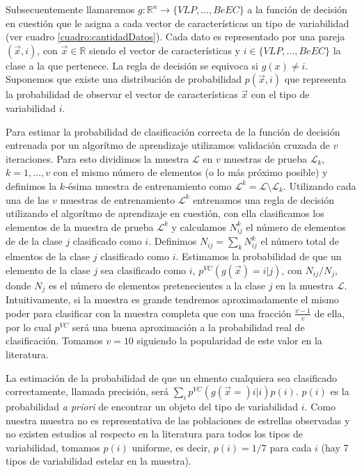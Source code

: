 \documentclass[letterpaper,12pt]{book}
\begin{document}
Subsecuentemente llamaremos $g:\mathbb{R}^{n}\rightarrow \{VLP,\dots, BeEC\}$ a la función de decisión en cuestión que le asigna a cada vector de características un tipo de variabilidad (ver cuadro \ref{cuadro:cantidadDatos}). Cada dato es representado por una pareja $(\vec{x}, i)$, con $\vec{x}\in\mathbb{R}$ siendo el vector de características y $i\in\{VLP,\dots, BeEC\}$ la clase a la que pertenece. La regla de decisión se equivoca si  $g(x)\neq i$. Suponemos que existe una distribución de probabilidad $p(\vec{x},i)$ que representa la probabilidad de observar el vector de características $\vec{x}$ con el tipo de variabilidad $i$.

Para estimar la probabilidad de clasificación correcta de la función de decisión entrenada por un algorítmo de aprendizaje utilizamos validación cruzada de $v$ iteraciones. Para esto dividimos la muestra $\mathcal{L}$ en $v$ muestras de prueba $\mathcal{L}_{k}$, $k=1,\dots,v$ con el mismo número de elementos (o lo más próximo posible) y definimos la $k$-ésima muestra de entrenamiento como $\mathcal{L}^{k} = \mathcal{L}\setminus \mathcal{L}_{k}$. Utilizando cada una de las $v$ muestras de entrenamiento $\mathcal{L}^{k}$  entrenamos una regla de decisión utilizando el algorítmo de aprendizaje en cuestión, con ella clasificamos los elementos de la muestra de prueba $\mathcal{L}^{k}$ y calculamos $N_{ij}^{k}$ el número de elementos de de la clase $j$ clasificado como $i$. Definimos $N_{ij}=\sum_{k}N_{ij}^{k}$ el número total de elmentos de la clase $j$ clasificado como $i$. Estimamos la probabilidad de que un elemento de la clase $j$ sea clasificado como $i$, $p^{VC}(g(\vec{x})=i|j)$, con $N_{ij}/N_{j}$, donde $N_{j}$ es el número de elementos pretenecientes a la clase $j$ en la muestra $\mathcal{L}$. Intuitivamente, si la muestra es grande tendremos aproximadamente el mismo poder para clasificar con la muestra completa que con una fracción $\frac{v-1}{v}$ de ella, por lo cual $p^{VC}$ será una buena aproximación a la probabilidad real de clasificación. Tomamos $v=10$ siguiendo la popularidad de este valor en la literatura. 

La estimación de la probabilidad de que un elmento cualquiera sea clasificado correctamente, llamada precisión,  será $\sum_{i}p^{VC}(g(\vec{x}=)i|i)p(i)$. $p(i)$ es la probabilidad \textit{a priori} de encontrar un objeto del tipo de variabilidad $i$. Como nuestra muestra no es representativa de las poblaciones de estrellas observadas y no existen estudios al respecto en la literatura para todos los tipos de variabilidad, tomamos $p(i)$ uniforme, es decir, $p(i) = 1/7$ para cada $i$ (hay 7 tipos de variabilidad estelar en la muestra).
\end{document}
